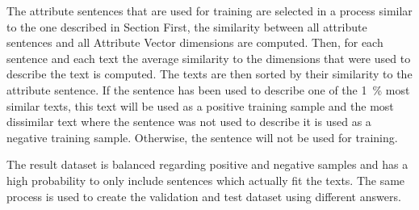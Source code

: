The attribute sentences that are used for training are selected in a process similar to the one described in Section%
First, the similarity between all attribute sentences and all Attribute Vector dimensions are computed. Then, for each sentence and each text the average similarity to the dimensions that were used to describe the text is computed. The texts are then sorted by their similarity to the attribute sentence. If the sentence has been used to describe one of the \SI{1}{\percent} most similar texts, this text will be used as a positive training sample and the most dissimilar text where the sentence was not used to describe it is used as a negative training sample. Otherwise, the sentence will not be used for training.

The result dataset is balanced regarding positive and negative samples and has a high probability to only include sentences which actually fit the texts. %
The same process is used to create the validation and test dataset using different answers. %

